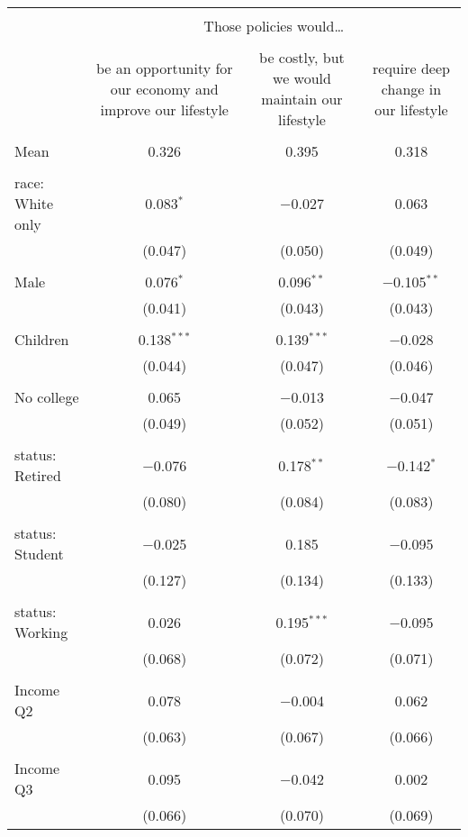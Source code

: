 
\begin{tabular}{@{\extracolsep{5pt}}lccc} 
\\[-1.8ex]\hline 
\hline \\[-1.8ex] 
 & \multicolumn{3}{c}{Those policies would…} \\ 
\cline{2-4} 
\\[-1.8ex] & be an opportunity for our economy and improve our lifestyle & be costly, but we would maintain our lifestyle & require deep change in our lifestyle \\ 
\hline \\[-1.8ex] 
 Mean & 0.326 & 0.395 & 0.318  \\ \hline \\[-1.8ex] race: White only & 0.083$^{*}$ & $-$0.027 & 0.063 \\ 
  & (0.047) & (0.050) & (0.049) \\ 
  & & & \\ 
 Male & 0.076$^{*}$ & 0.096$^{**}$ & $-$0.105$^{**}$ \\ 
  & (0.041) & (0.043) & (0.043) \\ 
  & & & \\ 
 Children & 0.138$^{***}$ & 0.139$^{***}$ & $-$0.028 \\ 
  & (0.044) & (0.047) & (0.046) \\ 
  & & & \\ 
 No college & 0.065 & $-$0.013 & $-$0.047 \\ 
  & (0.049) & (0.052) & (0.051) \\ 
  & & & \\ 
 status: Retired & $-$0.076 & 0.178$^{**}$ & $-$0.142$^{*}$ \\ 
  & (0.080) & (0.084) & (0.083) \\ 
  & & & \\ 
 status: Student & $-$0.025 & 0.185 & $-$0.095 \\ 
  & (0.127) & (0.134) & (0.133) \\ 
  & & & \\ 
 status: Working & 0.026 & 0.195$^{***}$ & $-$0.095 \\ 
  & (0.068) & (0.072) & (0.071) \\ 
  & & & \\ 
 Income Q2 & 0.078 & $-$0.004 & 0.062 \\ 
  & (0.063) & (0.067) & (0.066) \\ 
  & & & \\ 
 Income Q3 & 0.095 & $-$0.042 & 0.002 \\ 
  & (0.066) & (0.070) & (0.069) \\ 

\end{tabular}
